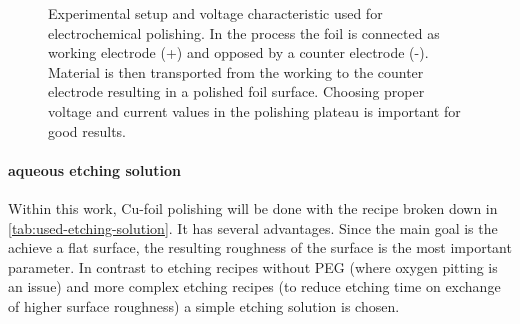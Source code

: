 \begin{figure}\centering
	 \quad%
	\caption{Experimental setup and voltage characteristic used for electrochemical polishing.  In the process the foil is connected as working electrode (+) and opposed by a counter electrode (-). Material is then transported from the working to the counter electrode resulting in a polished foil surface.  Choosing proper voltage and current values in the polishing plateau is important for good results.}
	\label{fig:setup-and-characteristic}
\end{figure}

\paragraph{aqueous etching solution}
Within this work, Cu-foil polishing will be done with the recipe broken down in \autoref{tab:used-etching-solution}. It has several advantages. Since the main goal is the achieve a flat surface, the resulting roughness of the surface is the most important parameter. In contrast to etching recipes without PEG (where oxygen pitting is an issue) and more complex etching recipes (to reduce etching time on exchange of higher surface roughness) a simple etching solution is chosen.

